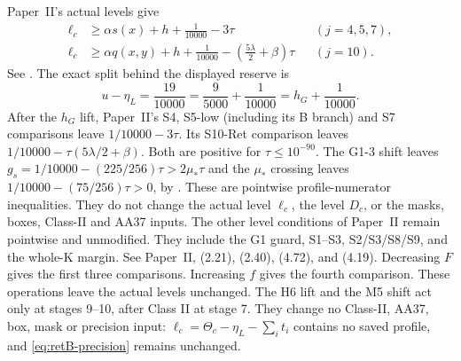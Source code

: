 Paper~II's actual levels give
\begin{equation}\label{eq:retB-H6-margins}
\begin{aligned}
 \ell_c&\ge\alpha s(x)+h+\frac1{10000}-3\tau
                   &&(j=4,5,7),\\
 \ell_c&\ge\alpha q(x,y)+h+\frac1{10000}
                         -\left(\frac{5\lambda}{2}+\beta\right)\tau
                   &&(j=10).
\end{aligned}
\end{equation}
See \cite[\S2.4, proof of (2.26)--(2.31);
\S2.5, proof of (2.40)]{PaperII}.
The exact split behind the displayed reserve is
\begin{equation}\label{eq:retB-level-buffer}
 u-\eta_L=\frac{19}{10000}
 =\frac9{5000}+\frac1{10000}=h_G+\frac1{10000}.
\end{equation}
After the $h_G$ lift, Paper~II's S4, S5-low (including its B branch)
and S7 comparisons leave $1/10000-3\tau$. Its S10-Ret comparison leaves
$1/10000-\tau(5\lambda/2+\beta)$.
Both are positive for $\tau\le10^{-90}$.
The G1-3 shift leaves
$g_s=1/10000-(225/256)\tau>2\mu_*\tau$ and the $\mu_*$ crossing
leaves $1/10000-(75/256)\tau>0$, by \cite[(4.72)]{PaperII}.
These are pointwise profile-numerator inequalities. They do not change
the actual level $\ell_c$, the level $D_c$, or the masks, boxes,
Class-II and AA37 inputs. The other level conditions of Paper~II
remain pointwise and unmodified. They include the G1 guard, S1--S3,
S2/S3/S8/S9, and the whole-K margin. See Paper~II, (2.21), (2.40),
(4.72), and (4.19).
Decreasing $F$ gives the first three comparisons.
Increasing $f$ gives the fourth comparison.
These operations leave the actual levels unchanged.
The H6 lift and the M5 shift act only at stages 9--10, after Class II
at stage 7. They change no Class-II, AA37, box, mask or precision input:
$\ell_c=\Theta_c-\eta_L-\sum_i t_i$ contains no saved profile, and
\eqref{eq:retB-precision} remains unchanged.

